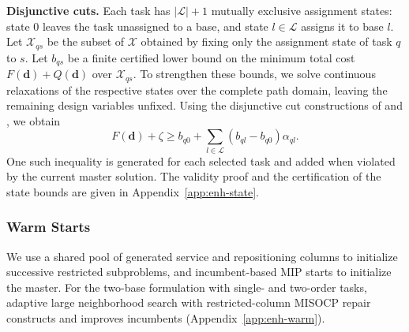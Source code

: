 \documentclass[11pt]{article}
\begin{document}
\medskip
\noindent\textbf{Disjunctive cuts.}
Each task has $|\mathcal L|+1$ mutually exclusive assignment states: state $0$ leaves the task unassigned to a base, and state $l\in\mathcal L$ assigns it to base $l$.
Let $\mathcal X_{qs}$ be the subset of $\mathcal X$ obtained by fixing only the assignment state of task $q$ to $s$.
Let $b_{qs}$ be a finite certified lower bound on the minimum total cost $F(\boldsymbol d)+Q(\boldsymbol d)$ over $\mathcal X_{qs}$.
To strengthen these bounds, we solve continuous relaxations of the respective states over the complete path domain, leaving the remaining design variables unfixed.
Using the disjunctive cut constructions of \citet{ChenLuedtke2024Sparse} and \citet{KronqvistMisener2021Disjunctive}, we obtain
\begin{equation}
    F(\boldsymbol d)+\zeta
    \ge b_{q0}
    +\sum_{l\in\mathcal L}(b_{ql}-b_{q0})\alpha_{ql}.
    \label{eq:enh-state-cut}
\end{equation}
One such inequality is generated for each selected task and added when violated by the current master solution.
The validity proof and the certification of the state bounds are given in Appendix~\ref{app:enh-state}.

\subsubsection{Warm Starts}

We use a shared pool of generated service and repositioning columns to initialize successive restricted subproblems, and incumbent-based MIP starts to initialize the master.
For the two-base formulation with single- and two-order tasks, adaptive large neighborhood search with restricted-column MISOCP repair constructs and improves incumbents (Appendix~\ref{app:enh-warm}).

\clearpage
\appendix


\clearpage


\end{document}
